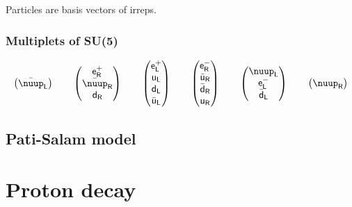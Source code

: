 \documentclass[english, fleqn]{beamer}
\begin{document}
\begin{frame}
    Particles are basis vectors of irreps.
\end{frame}

\begin{frame}
    \frametitle{Multiplets of SU(5)}
    \[
        \begin{pmatrix}
            \bar\nuup_\mathsf L
        \end{pmatrix}
        \qquad
        \begin{pmatrix}
            \mathsf e^+_\mathsf R \\
            \bar\nuup_\mathsf R \\
            \mathsf d_\mathsf R
        \end{pmatrix}
        \qquad
        \begin{pmatrix}
            \mathsf e^+_\mathsf L \\
            \mathsf u_\mathsf L \\
            \mathsf d_\mathsf L \\
            \bar{\mathsf u}_\mathsf L
        \end{pmatrix}
        \qquad
        \begin{pmatrix}
            \mathsf e^-_\mathsf R \\
            \bar{\mathsf u}_\mathsf R \\
            \bar{\mathsf d}_\mathsf R \\
            \mathsf u_\mathsf R
        \end{pmatrix}
        \qquad
        \begin{pmatrix}
            \nuup_\mathsf L \\
            \mathsf e^-_\mathsf L \\
            \bar{\mathsf d}_\mathsf L
        \end{pmatrix}
        \qquad
        \begin{pmatrix}
            \nuup_\mathsf R
        \end{pmatrix}
    \]
\end{frame}

\subsection{Pati-Salam model}

\begin{frame}
    \parencite{Wu/Proton_decay}
\end{frame}

\section{Proton decay}
\end{document}
